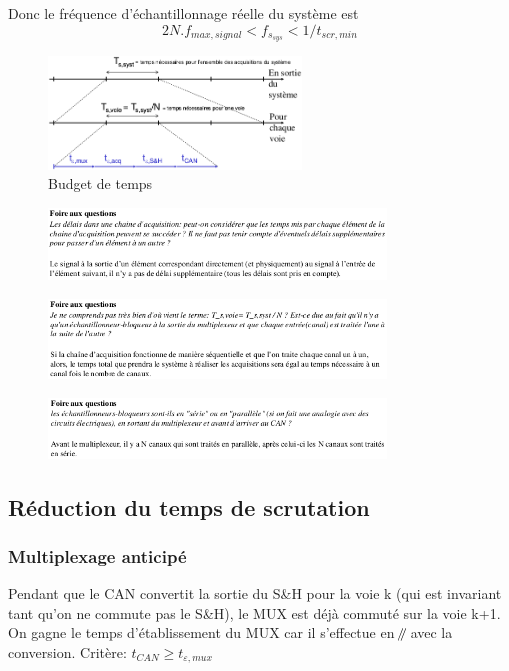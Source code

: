 Donc le fréquence d'échantillonnage réelle du système est
\[2N.f_{max,signal}<f_{s_{sys}}<1/t_{scr,min}\]
\begin{figure}[H] 
	\centering 
	\includegraphics[width=0.6\textwidth,height=10\baselineskip,keepaspectratio]{ch6/image7} 
	\caption{Budget de temps} 
\end{figure}
\begin{figure}[H] 
	\centering 
	\includegraphics[width=0.8\textwidth,height=10\baselineskip,keepaspectratio]{ch6/image8}  
\end{figure}
\begin{figure}[H] 
	\centering 
	\includegraphics[width=0.8\textwidth,height=10\baselineskip,keepaspectratio]{ch6/image9}  
\end{figure}
\begin{figure}[H] 
	\centering 
	\includegraphics[width=0.8\textwidth,height=10\baselineskip,keepaspectratio]{ch6/image10}  
\end{figure}
\subsection{Réduction du temps de scrutation}
\subsubsection{Multiplexage anticipé}
Pendant que le CAN convertit la sortie du S\&H pour la voie k (qui est invariant tant qu'on ne commute pas le S\&H), le MUX est déjà commuté sur la voie k+1. On gagne le temps d'établissement du MUX car il s'effectue en \(\mathbin{\!/\mkern-5mu/\!}\) avec la conversion. Critère: \(t_{CAN}\geq t_{\varepsilon,mux}\)
